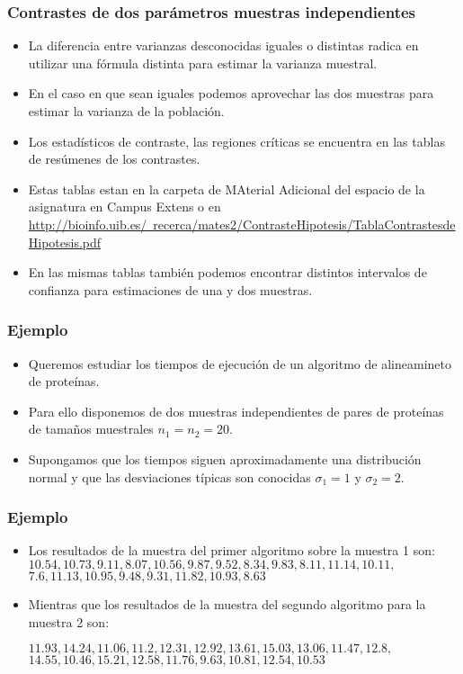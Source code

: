 \begin{frame}
\frametitle{Contrastes de dos parámetros muestras independientes}
\begin{itemize}
\item  La  diferencia entre varianzas desconocidas iguales o distintas radica  en utilizar una fórmula distinta para estimar la varianza muestral.
\item En el caso en que sean iguales podemos aprovechar las dos muestras para estimar la varianza de la población.
\item Los estadísticos de contraste, las regiones críticas se encuentra en las tablas de resúmenes de los contrastes.
\item Estas tablas estan en la carpeta de MAterial Adicional del espacio de la asignatura en Campus Extens o en 
\href{http://bioinfo.uib.es/~recerca/mates2/ContrasteHipotesis/TablaContrastesdeHipotesis.pdf}{http://bioinfo.uib.es/~recerca/mates2/ContrasteHipotesis/TablaContrastesdeHipotesis.pdf}
\item En las mismas tablas también podemos encontrar distintos intervalos
de confianza para estimaciones de una y dos muestras.
\end{itemize}
\end{frame}

\begin{frame}
\frametitle{Ejemplo}
\begin{itemize}
\item Queremos estudiar los tiempos de ejecución de un algoritmo de alineamineto de proteínas.
\item  Para ello disponemos de dos muestras  independientes de pares de proteínas de tamaños muestrales $n_1=n_2=20$.
\item Supongamos que los tiempos siguen aproximadamente una distribución normal y que las desviaciones típicas son conocidas $\sigma_1=1$ y $\sigma_2=2$.
\end{itemize}
\end{frame}
\begin{frame}
\frametitle{Ejemplo}
\begin{itemize}
\item Los resultados de la muestra del primer algoritmo sobre la muestra 1 son:
$10.54,10.73,9.11,8.07,10.56,9.87,9.52,8.34,9.83,8.11,11.14,10.11,$
$7.6,11.13,10.95,9.48,9.31,11.82,10.93,8.63$
\item Mientras que los resultados de la muestra del segundo algoritmo para la muestra 2 son:

$11.93,14.24,11.06,11.2,12.31,12.92,13.61,15.03,13.06,11.47,12.8,$
$14.55,10.46,15.21,12.58,11.76,9.63,10.81,12.54,10.53$
\end{itemize}
\end{frame}

